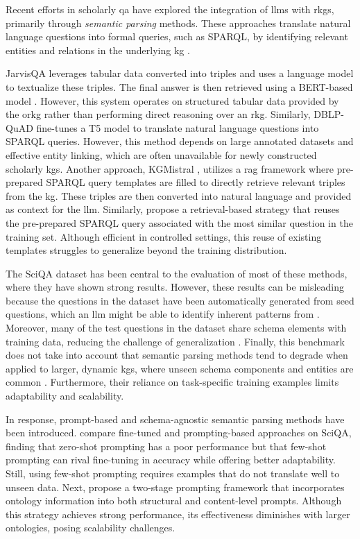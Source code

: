 Recent efforts in scholarly \gls{qa} have explored the integration of \glspl{llm} with \glspl{rkg}, primarily through \emph{semantic parsing} methods. These approaches translate natural language questions into formal queries, such as SPARQL, by identifying relevant entities and relations in the underlying \gls{kg} \cite{zhang_survey_2023}.

JarvisQA \cite{jaradeh_question_2020} leverages tabular data converted into triples and uses a language model to textualize these triples. The final answer is then retrieved using a BERT-based model \cite{devlin_bert_2019}. However, this system operates on structured tabular data provided by the \gls{orkg} rather than performing direct reasoning over an \gls{rkg}. Similarly, DBLP-QuAD \cite{banerjee_dblp-quad_2023} fine-tunes a T5 model \cite{raffel_exploring_2023} to translate natural language questions into SPARQL queries. However, this method depends on large annotated datasets and effective entity linking, which are often unavailable for newly constructed scholarly \glspl{kg}. Another approach, KGMistral \cite{li_kgmistral_2024}, utilizes a \gls{rag} framework where pre-prepared SPARQL query templates are filled to directly retrieve relevant triples from the \gls{kg}. These triples are then converted into natural language and provided as context for the \gls{llm}. Similarly, \textcite{taffa_leveraging_2023} propose a retrieval-based strategy that reuses the pre-prepared SPARQL query associated with the most similar question in the training set. Although efficient in controlled settings, this reuse of existing templates struggles to generalize beyond the training distribution.


The SciQA dataset has been central to the evaluation of most of these methods, where they have shown strong results. However, these results can be misleading because the questions in the dataset have been automatically generated from seed questions, which an \gls{llm} might be able to identify inherent patterns from \cite{lehmann_large_2024}. Moreover, many of the test questions in the dataset share schema elements with training data, reducing the challenge of generalization \cite{jiang_structure_2023}. Finally, this benchmark does not take into account that semantic parsing methods tend to degrade when applied to larger, dynamic \glspl{kg}, where unseen schema components and entities are common \cite{gu_knowledge_2022}. Furthermore, their reliance on task-specific training examples limits adaptability and scalability.

In response, prompt-based and schema-agnostic semantic parsing methods have been introduced. \textcite{lehmann_large_2024} compare fine-tuned and prompting-based approaches on SciQA, finding that zero-shot prompting has a poor performance but that few-shot prompting can rival fine-tuning in accuracy while offering better adaptability. Still, using few-shot prompting requires examples that do not translate well to unseen data. Next, \textcite{jiang_structure_2023} propose a two-stage prompting framework that incorporates ontology information into both structural and content-level prompts. Although this strategy achieves strong performance, its effectiveness diminishes with larger ontologies, posing scalability challenges.

